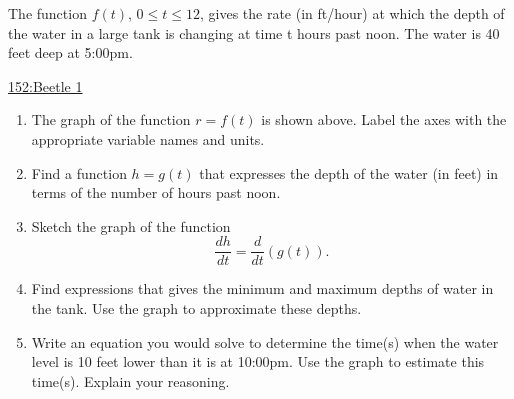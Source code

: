 \documentclass{ximera}
\begin{document}
\begin{question}\label{Q7yyweff}
The function $f(t)$, $0 \leq t \leq 12$, gives the rate (in ft/hour) at which the
depth of the water in a large tank is changing at time t hours past noon.
The water is 40 feet deep at 5:00pm.


\begin{onlineOnly}
    \begin{center}
\end{center}
\end{onlineOnly}

\href{https://www.desmos.com/calculator/gnwlraiqhd}{152:Beetle 1}



\begin{enumerate}
    \item The graph of the function $r=f(t)$ is shown above. Label the axes with
the appropriate variable names and units.

\item Find a function $h = g(t)$ that expresses the depth of the water (in feet) in terms of the number of hours past noon.

\item Sketch the graph of the function 
\[
   \frac{dh}{dt} = \frac{d}{dt}\left( g(t)\right).
\]

\item Find expressions that gives the minimum and maximum depths of water
in the tank. Use the graph to approximate these depths.

\item Write an equation you would solve to determine the time(s) when the
water level is 10 feet lower than it is at 10:00pm. Use the graph to estimate
this time(s). Explain your reasoning.
\end{enumerate}


\end{question}
\end{document}
